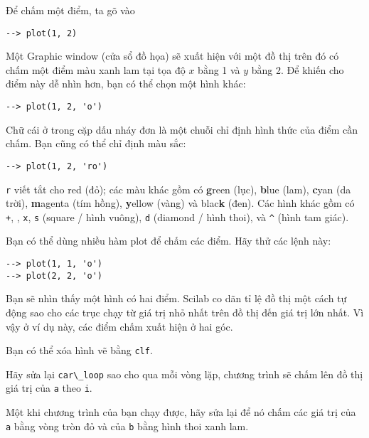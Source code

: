 \documentclass[12pt]{book}
\begin{document}
Để chấm một điểm, ta gõ vào

\begin{verbatim}
--> plot(1, 2)
\end{verbatim}

Một {\sf Graphic window} (cửa sổ đồ họa) sẽ xuất hiện với một đồ thị
trên đó có chấm một điểm màu xanh lam tại tọa độ $x$ bằng 1 và 
$y$ bằng 2. Để khiến cho điểm này dễ nhìn hơn, bạn có thể chọn một
hình khác:

\begin{verbatim}
--> plot(1, 2, 'o')
\end{verbatim}
%
Chữ cái ở trong cặp dấu nháy đơn là một chuỗi chỉ định hình thức
của điểm cần chấm. Bạn cũng có thể chỉ định màu sắc:

\begin{verbatim}
--> plot(1, 2, 'ro')
\end{verbatim}
%
{\tt r} viết tắt cho red (đỏ); các màu khác gồm có {\bf g}reen (lục),
{\bf b}lue (lam), {\bf c}yan (da trời), {\bf m}agenta (tím hồng), 
{\bf y}ellow (vàng) và blac{\bf k} (đen).
Các hình khác gồm có {\tt +}, 
{\tt *}, 
{\tt x}, 
{\tt s} (square / hình vuông), 
{\tt d} (diamond / hình thoi), và 
\verb+^+ (hình tam giác). 


Bạn có thể dùng nhiều hàm plot để chấm các điểm.
Hãy thử các lệnh này:

\begin{verbatim}
--> plot(1, 1, 'o')
--> plot(2, 2, 'o')
\end{verbatim}
%
Bạn sẽ nhìn thấy một hình có hai điểm. Scilab co dãn tỉ lệ đồ thị
một cách tự động sao cho các trục chạy từ giá trị nhỏ nhất trên đồ thị
đến giá trị lớn nhất. Vì vậy ở ví dụ này, các điểm chấm xuất hiện ở
hai góc.

Bạn có thể xóa hình vẽ bằng \texttt{clf}.
\begin{ex}
Hãy sửa lại \verb#car\_loop# sao cho qua mỗi vòng lặp, chương trình
sẽ chấm lên đồ thị giá trị của {\tt a} theo {\tt i}.

Một khi chương trình của bạn chạy được, hãy sửa lại để nó chấm
các giá trị của {\tt a} bằng vòng tròn đỏ và của {\tt b} bằng 
hình thoi xanh lam.

\end{ex}
\end{document}
